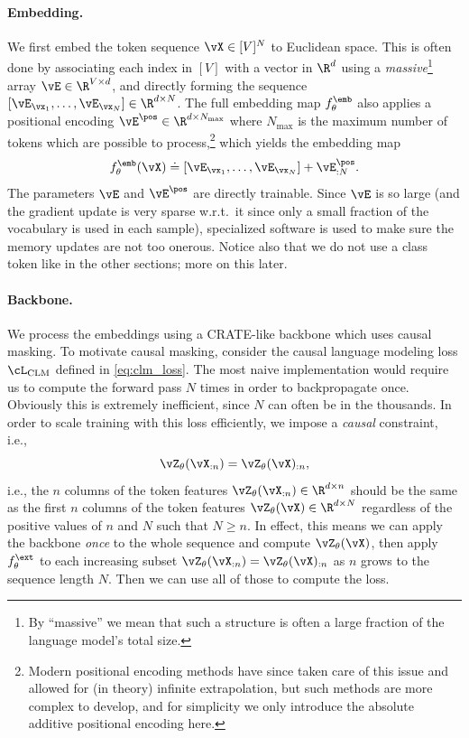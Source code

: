 \documentclass[../../book-main.tex]{subfiles}
\begin{document}
\paragraph{Embedding.} We first embed the token sequence \(\vX \in
[V]^{N}\) to Euclidean space. This is often done by associating each
index in \([V]\) with a vector in \(\R^{d}\) using a
\textit{massive}\footnote{By ``massive'' we mean that such a
structure is often a large fraction of the language model's total
size.} array \(\vE \in \R^{V \times d}\), and directly forming the
sequence \([\vE_{\vx_{1}}, \dots, \vE_{\vx_{N}}] \in \R^{d \times
N}\). The full embedding map \(f_{\theta}^{\emb}\) also applies a
positional encoding \(\vE^{\pos} \in \R^{d  \times N_{\max}}\) where
\(N_{\max}\) is the maximum number of tokens which are possible to
process,\footnote{Modern positional encoding methods have since taken
care of this issue and allowed for (in theory) infinite
extrapolation, but such methods are more complex to develop, and for
simplicity we only introduce the absolute additive positional
encoding here.} which yields the embedding map
\begin{equation}
f_{\theta}^{\emb}(\vX) \doteq [\vE_{\vx_{1}}, \dots, \vE_{\vx_{N}}] +
\vE_{:N}^{\pos} .
\end{equation}
The parameters \(\vE\) and \(\vE^{\pos}\) are directly trainable.
Since \(\vE\) is so large (and the gradient update is very sparse
w.r.t.~it since only a small fraction of the vocabulary is used in
each sample), specialized software is used to make sure the memory
updates are not too onerous. Notice also that we do not use a class
token like in the other sections; more on this later.

\paragraph{Backbone.} We process the embeddings using a CRATE-like
backbone which uses causal masking. To motivate causal masking,
consider the causal language modeling loss \(\cL_{\mathrm{CLM}}\)
defined in \eqref{eq:clm_loss}. The most naive implementation would
require us to compute the forward pass \(N\) times in order to
backpropagate once. Obviously this is extremely inefficient, since
\(N\) can often be in the thousands. In order to scale training with
this loss efficiently, we impose a \textit{causal} constraint, i.e.,
\begin{equation}\label{eq:causal_backbone_def}
\vZ_{\theta}(\vX_{:n}) = \vZ_{\theta}(\vX)_{:n} ,
\end{equation}
i.e., the \(n\) columns of the token features
\(\vZ_{\theta}(\vX_{:n}) \in \R^{d \times n}\) should be the same as
the first \(n\) columns of the token features \(\vZ_{\theta}(\vX) \in
\R^{d \times N}\) regardless of the positive values of \(n\) and
\(N\) such that \(N \geq n\). In effect, this means we can apply the
backbone \textit{once} to the whole sequence and compute
\(\vZ_{\theta}(\vX)\), then apply \(f_{\theta}^{\ext}\) to each
increasing subset \(\vZ_{\theta}(\vX_{:n}) = \vZ_{\theta}(\vX)_{:n}\)
as \(n\) grows to the sequence length \(N\). Then we can use all of
those to compute the loss.
\end{document}
